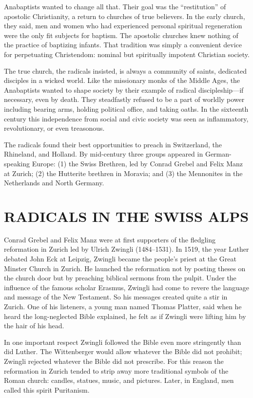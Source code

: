 Anabaptists wanted to change all that. Their goal was the “restitution” of apostolic Christianity, a
return to churches of true believers. In the early church, they said, men and women who had
experienced personal spiritual regeneration were the only fit subjects for baptism. The apostolic
churches knew nothing of the practice of baptizing infants. That tradition was simply a convenient
device for perpetuating Christendom: nominal but spiritually impotent Christian society.

The true church, the radicals insisted, is always a community of saints, dedicated disciples in a
wicked world. Like the missionary monks of the Middle Ages, the Anabaptists wanted to shape society
by their example of radical discipleship—if necessary, even by death. They steadfastly refused to be
a part of worldly power including bearing arms, holding political office, and taking oaths. In the
sixteenth century this independence from social and civic society was seen as inflammatory,
revolutionary, or even treasonous.

The radicals found their best opportunities to preach in Switzerland, the Rhineland, and Holland. By
mid-century three groups appeared in German-speaking Europe: (1) the Swiss Brethren, led by Conrad
Grebel and Felix Manz at Zurich; (2) the Hutterite brethren in Moravia; and (3) the Mennonites in
the Netherlands and North Germany.

\section{RADICALS IN THE SWISS ALPS}

Conrad Grebel and Felix Manz were at first supporters of the fledgling reformation in Zurich led by
Ulrich Zwingli (1484–1531). In 1519, the year Luther debated John Eck at Leipzig, Zwingli became the
people’s priest at the Great Minster Church in Zurich. He launched the reformation not by posting
theses on the church door but by preaching biblical sermons from the pulpit. Under the influence of
the famous scholar Erasmus, Zwingli had come to revere the language and message of the New
Testament. So his messages created quite a stir in Zurich. One of his listeners, a young man named
Thomas Platter, said when he heard the long-neglected Bible explained, he felt as if Zwingli were
lifting him by the hair of his head.

In one important respect Zwingli followed the Bible even more stringently than did Luther. The
Wittenberger would allow whatever the Bible did not prohibit; Zwingli rejected whatever the Bible
did not prescribe. For this reason the reformation in Zurich tended to strip away more traditional
symbols of the Roman church: candles, statues, music, and pictures. Later, in England, men called
this spirit Puritanism.

